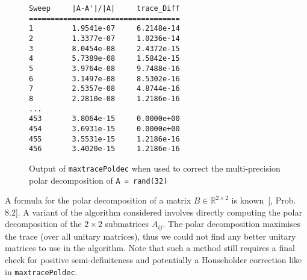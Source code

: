 \documentclass[10pt, A4paper]{article}
\begin{document}
\begin{figure}
	\centering
{\small
\begin{BVerbatim}
Sweep     |A-A'|/|A|     trace_Diff
===================================
1         1.9541e-07     6.2148e-14
2         1.3377e-07     1.0236e-14
3         8.0454e-08     2.4372e-15
4         5.7389e-08     1.5842e-15
5         3.9764e-08     9.7488e-16
6         3.1497e-08     8.5302e-16
7         2.5357e-08     4.8744e-16
8         2.2810e-08     1.2186e-16
...
453       3.8064e-15     0.0000e+00
454       3.6931e-15     0.0000e+00
455       3.5531e-15     1.2186e-16
456       3.4020e-15     1.2186e-16
\end{BVerbatim}
}
	\caption{\label{fig:maxtraceOutput}
		Output of \texttt{maxtracePoldec} when used to correct the
		multi-precision polar decomposition of \texttt{A = rand(32)}
	}
\end{figure}

A formula for the polar decomposition of a matrix $B \in \mathbb{R}^   
{2\times 2}$ is known~{[\citealp{high2008}, Prob. 8.2]}.
A variant of the algorithm considered involves directly computing the
polar decomposition of the $2\times 2$ submatrices $A_{ij}$.
The polar decomposition maximises the trace (over all unitary 
matrices), thus we could not find any better unitary matrices to use in 
the algorithm.
Note that such a method still requires a final check for positive
semi-definiteness and potentially a Householder correction like in
\texttt{maxtracePoldec}.
\end{document}
